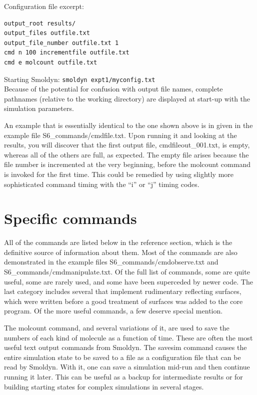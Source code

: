 \documentclass {scrbook}
\newcommand {\ttt} {\texttt}
\begin{document}
Configuration file excerpt:
\begin{lstlisting}[style=SSAC]
output_root results/
output_files outfile.txt
output_file_number outfile.txt 1
cmd n 100 incrementfile outfile.txt
cmd e molcount outfile.txt
\end{lstlisting}
Starting Smoldyn: \ttt{smoldyn expt1/myconfig.txt}\\

Because of the potential for confusion with output file names, complete pathnames (relative to the working directory) are displayed at start-up with the simulation parameters.

An example that is essentially identical to the one shown above is in given in the example file S6\_commands/cmdfile.txt. Upon running it and looking at the results, you will discover that the first output file, cmdfileout\_001.txt, is empty, whereas all of the others are full, as expected. The empty file arises because the file number is incremented at the very beginning, before the molcount command is invoked for the first time. This could be remedied by using slightly more sophisticated command timing with the ``i'' or ``j'' timing codes.

\section{Specific commands}

All of the commands are listed below in the reference section, which is the definitive source of information about them. Most of the commands are also demonstrated in the example files S6\_commands/cmdobserve.txt and S6\_commands/cmdmanipulate.txt. Of the full list of commands, some are quite useful, some are rarely used, and some have been superceded by newer code. The last category includes several that implement rudimentary reflecting surfaces, which were written before a good treatment of surfaces was added to the core program. Of the more useful commands, a few deserve special mention.

The molcount command, and several variations of it, are used to save the numbers of each kind of molecule as a function of time. These are often the most useful text output commands from Smoldyn.
The savesim command causes the entire simulation state to be saved to a file as a configuration file that can be read by Smoldyn. With it, one can save a simulation mid-run and then continue running it later. This can be useful as a backup for intermediate results or for building starting states for complex simulations in several stages.
\end{document}
